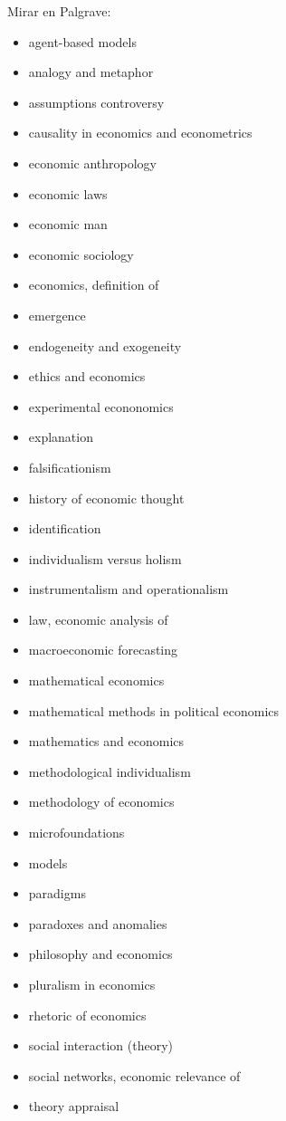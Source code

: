 \documentclass{nuevotema}
\begin{document}
\bibliografia

Mirar en Palgrave:
\begin{itemize}
	\item agent-based models
	\item analogy and metaphor
	\item assumptions controversy
	\item causality in economics and econometrics
	\item economic anthropology
	\item economic laws
	\item economic man
	\item economic sociology
	\item economics, definition of
	\item emergence
	\item endogeneity and exogeneity
	\item ethics and economics
	\item experimental econonomics
	\item explanation
	\item falsificationism
	\item history of economic thought
	\item identification
	\item individualism versus holism
	\item instrumentalism and operationalism
	\item law, economic analysis of
	\item macroeconomic forecasting
	\item mathematical economics
	\item mathematical methods in political economics
	\item mathematics and economics
	\item methodological individualism
	\item methodology of economics
	\item microfoundations
	\item models
	\item paradigms
	\item paradoxes and anomalies
	\item philosophy and economics
	\item pluralism in economics
	\item rhetoric of economics
	\item social interaction (theory)
	\item social networks, economic relevance of
	\item theory appraisal
\end{itemize}
\end{document}
